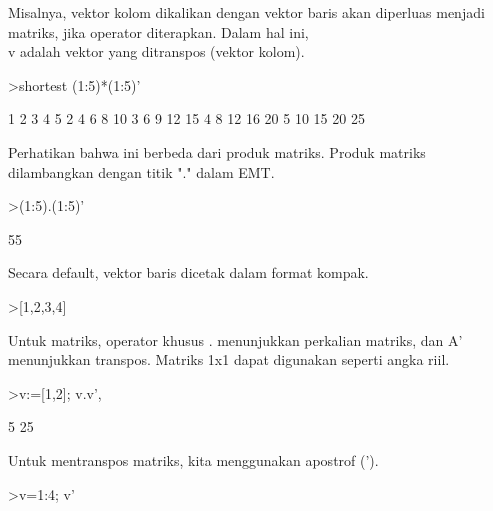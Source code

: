 \documentclass[a4paper,10pt]{article}
\begin{document}
\begin{eulernotebook}
\begin{eulercomment}
\begin{eulercomment}
\begin{eulercomment}
\begin{eulercomment}
\begin{eulercomment}
\begin{eulercomment}
\begin{eulercomment}
\begin{eulercomment}
\begin{eulercomment}
\begin{eulercomment}
\begin{eulercomment}
\begin{eulercomment}
\begin{eulercomment}
\begin{eulercomment}
\begin{eulercomment}
\begin{eulercomment}
\begin{eulercomment}
\begin{eulercomment}
\begin{eulercomment}
\begin{eulercomment}
\begin{eulercomment}
Misalnya, vektor kolom dikalikan dengan vektor baris akan diperluas
menjadi matriks, jika operator diterapkan. Dalam hal ini, \\
v adalah vektor yang ditranspos (vektor kolom).
\end{eulercomment}
\begin{eulerprompt}
>shortest (1:5)*(1:5)'
\end{eulerprompt}
\begin{euleroutput}
       1      2      3      4      5 
       2      4      6      8     10 
       3      6      9     12     15 
       4      8     12     16     20 
       5     10     15     20     25 
\end{euleroutput}
\begin{eulercomment}
Perhatikan bahwa ini berbeda dari produk matriks. Produk matriks
dilambangkan dengan titik "." dalam EMT.
\end{eulercomment}
\begin{eulerprompt}
>(1:5).(1:5)'
\end{eulerprompt}
\begin{euleroutput}
  55
\end{euleroutput}
\begin{eulercomment}
Secara default, vektor baris dicetak dalam format kompak.
\end{eulercomment}
\begin{eulerprompt}
>[1,2,3,4]
\end{eulerprompt}
\begin{euleroutput}
  [1,  2,  3,  4]
\end{euleroutput}
\begin{eulercomment}
Untuk matriks, operator khusus . menunjukkan perkalian matriks, dan A'
menunjukkan transpos. Matriks 1x1 dapat digunakan seperti angka riil.
\end{eulercomment}
\begin{eulerprompt}
>v:=[1,2]; v.v', %
\end{eulerprompt}
\begin{euleroutput}
  5
  25
\end{euleroutput}
\begin{eulercomment}
Untuk mentranspos matriks, kita menggunakan apostrof (').
\end{eulercomment}
\begin{eulerprompt}
>v=1:4; v'
\end{eulerprompt}

\end{eulercomment}
\end{eulercomment}
\end{eulercomment}
\end{eulercomment}
\end{eulercomment}
\end{eulercomment}
\end{eulercomment}
\end{eulercomment}
\end{eulercomment}
\end{eulercomment}
\end{eulercomment}
\end{eulercomment}
\end{eulercomment}
\end{eulercomment}
\end{eulercomment}
\end{eulercomment}
\end{eulercomment}
\end{eulercomment}
\end{eulercomment}
\end{eulercomment}
\end{eulernotebook}
\end{document}
